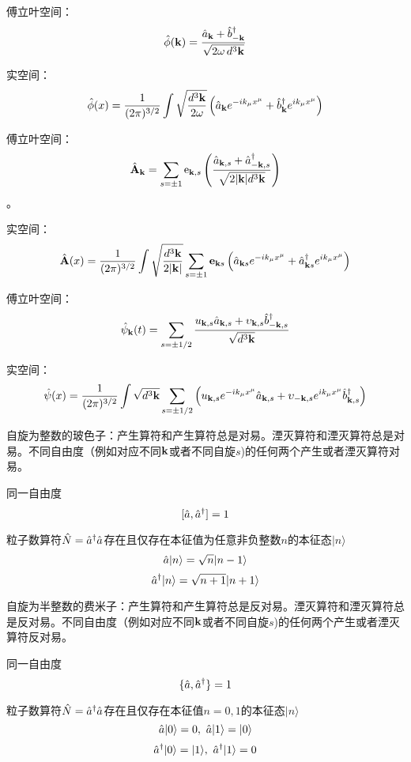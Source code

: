 \documentclass[CJK]{beamer}
\begin{document}
\begin{frame}
\bch
傅立叶空间：
$${\hat{\phi}}({\mathbf{k}}) = \frac{{\hat{a}}_{{\mathbf{k}}}+{\hat{b}^\dagger}_{-{\mathbf{k}}}}{\sqrt{2\omega\, d^3{\mathbf{k}}}}$$


\skipline
实空间：
$${\hat{\phi}}(x) = \frac{1}{(2\pi)^{3/2}} \int \sqrt{\frac{d^3{\mathbf{k}}}{2\omega}} \left({\hat{a}}_{{\mathbf{k}}} e^{-ik_\mu x^\mu} + {\hat{b}^\dagger}_{{\mathbf{k}}}e^{ik_\mu x^\mu}\right) $$
\ech
\end{frame}

\begin{frame}
\bch

傅立叶空间：
$$ \hat{{\mathbf{A}}}_{{\mathbf{k}}} = \sum_{s=\pm 1} \mathrm{e}_{{\mathbf{k}},s}\left(\frac{{\hat{a}}_{{\mathbf{k}},s} + {\hat{a}^\dagger}_{-{\mathbf{k}},s}}{\sqrt{2 |{\mathbf{k}}| d^3{\mathbf{k}}}}\right)$$。


\skipline
实空间：
$$\hat{{\mathbf{A}}}(x) = \frac{1}{(2\pi)^{3/2}} \int \sqrt{\frac{d^3{\mathbf{k}}}{2|{\mathbf{k}}|}} \sum_{s=\pm 1}\mathbf{e}_{{\mathbf{k}} s}\left({\hat{a}}_{{\mathbf{k}} s} e^{-ik_\mu x^\mu} + {\hat{a}^\dagger}_{{\mathbf{k}} s}e^{ik_\mu x^\mu}\right) $$
\ech
\end{frame}

\begin{frame}
\bch
傅立叶空间：
$$\hat\psi_{{\mathbf{k}}}(t) = \sum_{s=\pm 1/2} \frac{u_{{\mathbf{k}},s}{\hat{a}}_{{\mathbf{k}},s} + \upsilon_{{\mathbf{k}},s}{\hat{b}^\dagger}_{-{\mathbf{k}},s}}{\sqrt{d^3{\mathbf{k}}}} $$

实空间：
$$\hat\psi(x) = \frac{1}{(2\pi)^{3/2}}\int \sqrt{d^3{\mathbf{k}}} \sum_{s=\pm 1/2} \left(u_{{\mathbf{k}},s}e^{-{\dot{\imath}} k_\mu x^\mu} {\hat{a}}_{{\mathbf{k}},s} + \upsilon_{-{\mathbf{k}},s}e^{{\dot{\imath}} k_\mu x^\mu} {\hat{b}^\dagger}_{{\mathbf{k}},s}\right)$$
\ech
\end{frame}

\begin{frame}
\bch
自旋为整数的玻色子：产生算符和产生算符总是对易。湮灭算符和湮灭算符总是对易。不同自由度（例如对应不同${\mathbf{k}}$或者不同自旋$s$)的任何两个产生或者湮灭算符对易。

同一自由度
$$[{\hat{a}}, {\hat{a}^\dagger}] = 1$$

\skipline
粒子数算符$\hat{N}={\hat{a}^\dagger}{\hat{a}}$存在且仅存在本征值为任意非负整数$n$的本征态$|n\rangle$
$${\hat{a}}|n\rangle = \sqrt{n}|n-1\rangle $$
$${\hat{a}^\dagger}|n\rangle = \sqrt{n+1}|n+1\rangle$$

\ech
\end{frame}

\begin{frame}
\bch
自旋为半整数的费米子：产生算符和产生算符总是反对易。湮灭算符和湮灭算符总是反对易。不同自由度（例如对应不同${\mathbf{k}}$或者不同自旋$s$)的任何两个产生或者湮灭算符反对易。

同一自由度
$$\{{\hat{a}}, {\hat{a}^\dagger}\} = 1$$

\skipline
粒子数算符$\hat{N}={\hat{a}^\dagger}{\hat{a}}$存在且仅存在本征值$n=0,1$的本征态$|n\rangle$
$${\hat{a}}|0 \rangle = 0,\ {\hat{a}}|1\rangle = |0\rangle $$
$${\hat{a}^\dagger}|0 \rangle = |1\rangle, \  {\hat{a}^\dagger}|1\rangle = 0$$
 
\ech
\end{frame}
\end{document}
